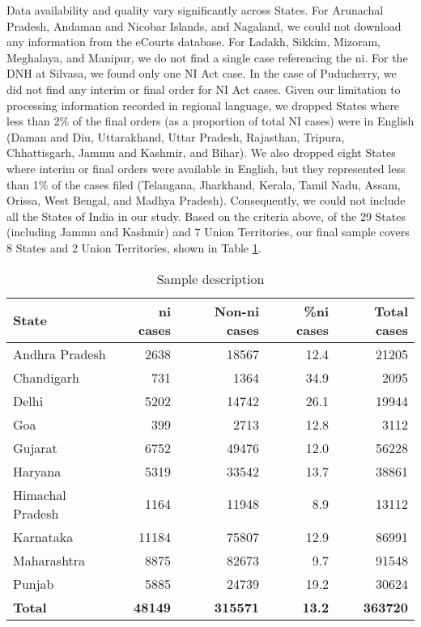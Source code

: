 \documentclass[12pt,a4paper]{article}
\begin{document}
Data availability and quality vary significantly across States. For Arunachal Pradesh, Andaman and Nicobar Islands, and Nagaland, we could not download any information from the eCourts database. For Ladakh, Sikkim, Mizoram, Meghalaya, and Manipur, we do not find a single case referencing the \gls{ni}. For the DNH at Silvasa, we found only one NI Act case. In the case of Puducherry, we did not find any interim or final order for NI Act cases. Given our limitation to processing information recorded in regional language, we dropped States where less than 2\% of the final orders (as a proportion of total NI cases) were in English (Daman and Diu, Uttarakhand, Uttar Pradesh, Rajasthan, Tripura, Chhattisgarh, Jammu and Kashmir, and Bihar). We also dropped eight States where interim or final orders were available in English, but they represented less than 1\% of the cases filed (Telangana, Jharkhand, Kerala, Tamil Nadu, Assam, Orissa, West Bengal, and Madhya Pradesh). Consequently, we could not include all the States of India in our study. Based on the criteria above, of the 29 States (including Jammu and Kashmir) and 7 Union Territories, our final sample covers 8 States and 2 Union Territories, shown in Table \ref{tab:sample_desc}.

\begin{table}[!ht]
\caption{Sample description} \label{tab:sample_desc}
\centering
\footnotesize
\begin{tabular}{lrrr|r}
\toprule
\textbf{State} & \textbf{\gls{ni} cases} & \textbf{Non-\gls{ni} cases} & \textbf{\%\gls{ni} cases} & \textbf{Total cases}\\ \midrule
Andhra Pradesh & 2638 & 18567 & 12.4 & 21205\\
Chandigarh & 731 & 1364 & 34.9 & 2095\\
Delhi & 5202 & 14742 & 26.1 & 19944\\
Goa & 399 & 2713 & 12.8 & 3112\\
Gujarat & 6752 & 49476 & 12.0 & 56228\\
Haryana & 5319 & 33542 & 13.7 & 38861\\
Himachal Pradesh & 1164 & 11948 & 8.9 & 13112\\
Karnataka & 11184 & 75807 & 12.9 & 86991\\
Maharashtra & 8875 & 82673 & 9.7 & 91548\\
Punjab & 5885 & 24739 & 19.2 & 30624\\
\midrule
\textbf{Total} & \textbf{48149} & \textbf{315571} & \textbf{13.2} & \textbf{363720}\\ \bottomrule
\end{tabular}
\end{table}
\end{document}
